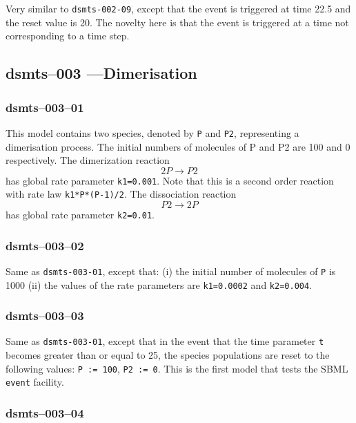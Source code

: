 Very similar to \verb$dsmts-002-09$, except that the event is
triggered at time 22.5 and the reset value is 20. The novelty here is
that the event is triggered at a time not corresponding to a time step.


\subsection{dsmts--003 ---Dimerisation }

\subsubsection{dsmts--003--01}

This model contains two species, denoted by \verb$P$ and \verb$P2$,
representing a dimerisation process. The initial numbers of molecules
of P and P2 are 100 and 0 respectively. The dimerization reaction 
\[
2P \longrightarrow P2
\]
has global rate parameter \verb$k1=0.001$. Note
that this is a second order reaction with rate law
\verb$k1*P*(P-1)/2$. The dissociation reaction 
\[
P2 \longrightarrow 2P
\] 
has global rate parameter \verb$k2=0.01$. 


\subsubsection{dsmts--003--02} 

Same as \verb$dsmts-003-01$, except that: (i) the initial number of
molecules of \verb$P$ is 1000 (ii) the values of the rate parameters
are \verb$k1=0.0002$ and \verb$k2=0.004$. 


\subsubsection{dsmts--003--03} 

Same as \verb$dsmts-003-01$, except that in the event that the time
parameter \verb$t$ becomes greater than or equal to 25, the species
populations are reset to the following values: \verb$P := 100$,
\verb$P2 := 0$. This is the first model that tests the SBML
\verb$event$ facility.


\subsubsection{dsmts--003--04} 

